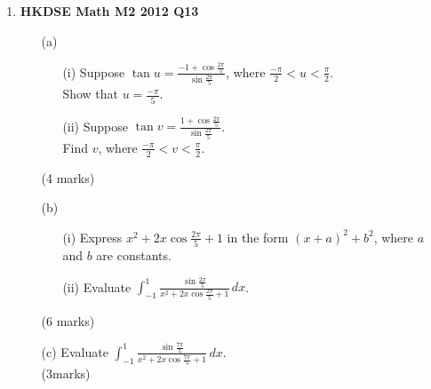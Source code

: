 \documentclass[12pt]{article}
\begin{document}
\begin{enumerate}
	\item \textbf{HKDSE Math M2 2012 Q13}
	\begin{enumerate}
		\item [(a)]
		\begin{enumerate}
			\item [(i)]Suppose $\tan{u} = \displaystyle\frac{-1 + \cos{\displaystyle\frac{2\pi}{5}}}{\sin{\displaystyle\frac{2\pi}{5}}}$, where $\displaystyle\frac{-\pi}{2} < u < \frac{\pi}{2}$. \\
			Show that $u = \displaystyle\frac{-\pi}{5}$. 
			\item [(ii)]Suppose $\tan{v} = \displaystyle\frac{1+\cos{\displaystyle\frac{2\pi}{5}}}{\sin{\displaystyle\frac{2\pi}{5}}}$. \\
			Find $v$, where $\displaystyle\frac{-\pi}{2} < v < \frac{\pi}{2}$.
		\end{enumerate}
		(4 marks)
		\item[(b)]
		\begin{enumerate}
			\item[(i)]Express $x^2 + 2x\cos{\displaystyle\frac{2\pi}{5}} + 1$ in the form $(x+a)^2 + b^2$, where $a$ and $b$ are constants. 
			\item[(ii)]Evaluate $\displaystyle\int_{-1}^{1}\frac{\sin{\displaystyle\frac{2\pi}{5}}}{x^2 + 2x\cos{\displaystyle\frac{2\pi}{5}}+1}\, dx$.
		\end{enumerate}
		(6 marks)
		\item[(c)]Evaluate $\displaystyle\int_{-1}^{1}\frac{\sin{\displaystyle\frac{7\pi}{5}}}{x^2 + 2x\cos{\displaystyle\frac{7\pi}{5}}+1} \,dx$. \\(3marks)
	\end{enumerate}



\end{enumerate}
\end{document}
